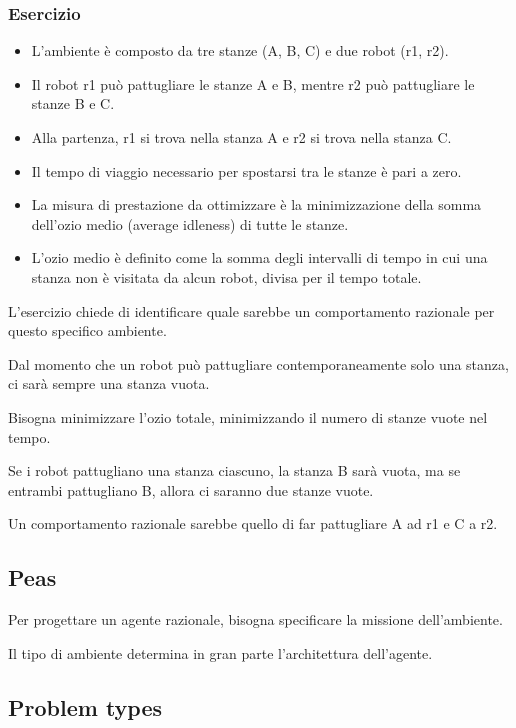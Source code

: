 \documentclass[12pt, a4paper]{article}
\begin{document}
\subsubsection*{Esercizio}
\begin{itemize}
  \item L'ambiente è composto da tre stanze (A, B, C) e due robot (r1, r2).
  
  \item Il robot r1 può pattugliare le stanze A e B, mentre r2 può pattugliare le stanze B e C.
  
  \item Alla partenza, r1 si trova nella stanza A e r2 si trova nella stanza C.
  
  \item Il tempo di viaggio necessario per spostarsi tra le stanze è pari a zero.
  
  \item La misura di prestazione da ottimizzare è la minimizzazione della somma dell'ozio medio (average idleness) di tutte le stanze.
  
  \item L'ozio medio è definito come la somma degli intervalli di tempo in cui una stanza non è visitata da alcun robot, divisa per il tempo totale.
\end{itemize}  

L'esercizio chiede di identificare quale sarebbe un comportamento razionale per questo specifico ambiente.

Dal momento che un robot può pattugliare contemporaneamente solo una stanza, ci sarà sempre una stanza vuota.

Bisogna minimizzare l'ozio totale, minimizzando il numero di stanze vuote nel tempo.

Se i robot pattugliano una stanza ciascuno, la stanza B sarà vuota, ma se entrambi pattugliano B, allora ci saranno due stanze vuote.

Un comportamento razionale sarebbe quello di far pattugliare A ad r1 e C a r2.

\subsection{Peas}

Per progettare un agente razionale, bisogna specificare la missione dell'ambiente.

Il tipo di ambiente determina in gran parte l'architettura dell'agente.

\subsection{Problem types}
\end{document}
